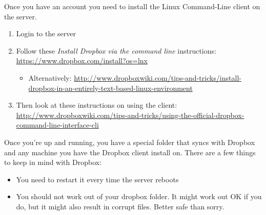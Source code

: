 \documentclass[]{tufte-handout}
\begin{document}
Once you have an account you need to install the Linux Command-Line client on the server.  
\begin{enumerate}
\item Login to the server
\item Follow these \textit{Install Dropbox via the command line} instructions: \url{https://www.dropbox.com/install?os=lnx}
\begin{itemize}
\item Alternatively: \url{http://www.dropboxwiki.com/tips-and-tricks/install-dropbox-in-an-entirely-text-based-linux-environment}
\end{itemize}
\item Then look at these instructions on using the client: \url{http://www.dropboxwiki.com/tips-and-tricks/using-the-official-dropbox-command-line-interface-cli}
\end{enumerate}

Once you're up and running, you have a special folder that syncs with Dropbox and any machine you have the Dropbox client install on. There are a few things to keep in mind with Dropbox:
\begin{itemize}
\item You need to restart it every time the server reboots
\item You should not work out of your dropbox folder. It might work out OK if you do, but it might also result in corrupt files. Better safe than sorry.
\end{itemize}
\end{document}
